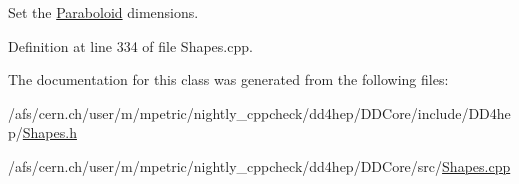 Set the \hyperlink{class_d_d4hep_1_1_geometry_1_1_paraboloid}{Paraboloid} dimensions. 



Definition at line 334 of file Shapes.\+cpp.



The documentation for this class was generated from the following files\+:\begin{DoxyCompactItemize}
\item 
/afs/cern.\+ch/user/m/mpetric/nightly\+\_\+cppcheck/dd4hep/\+D\+D\+Core/include/\+D\+D4hep/\hyperlink{_shapes_8h}{Shapes.\+h}\item 
/afs/cern.\+ch/user/m/mpetric/nightly\+\_\+cppcheck/dd4hep/\+D\+D\+Core/src/\hyperlink{_shapes_8cpp}{Shapes.\+cpp}\end{DoxyCompactItemize}

